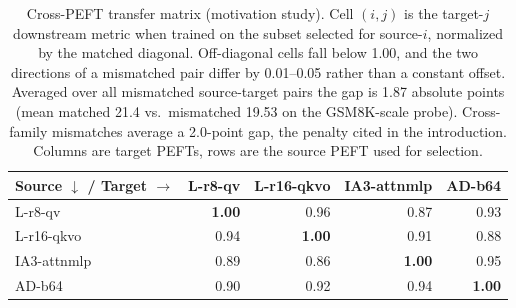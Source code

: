 \begin{table}[t]
\centering
\small
\setlength{\tabcolsep}{6pt}
\begin{tabular}{lrrrr}
\toprule
Source $\downarrow$ / Target $\rightarrow$ & L-r8-qv & L-r16-qkvo & IA3-attnmlp & AD-b64 \\
\midrule
L-r8-qv & \textbf{1.00} & 0.96 & 0.87 & 0.93 \\
L-r16-qkvo & 0.94 & \textbf{1.00} & 0.91 & 0.88 \\
IA3-attnmlp & 0.89 & 0.86 & \textbf{1.00} & 0.95 \\
AD-b64 & 0.90 & 0.92 & 0.94 & \textbf{1.00} \\
\bottomrule
\end{tabular}
\caption{Cross-PEFT transfer matrix (motivation study). Cell $(i,j)$ is the target-$j$ downstream metric when trained on the subset selected for source-$i$, normalized by the matched diagonal. Off-diagonal cells fall below 1.00, and the two directions of a mismatched pair differ by 0.01--0.05 rather than a constant offset. Averaged over all mismatched source-target pairs the gap is 1.87 absolute points (mean matched 21.4 vs.\ mismatched 19.53 on the GSM8K-scale probe). Cross-family mismatches average a 2.0-point gap, the penalty cited in the introduction. Columns are target PEFTs, rows are the source PEFT used for selection.}
\label{tab:transfer}
\end{table}
